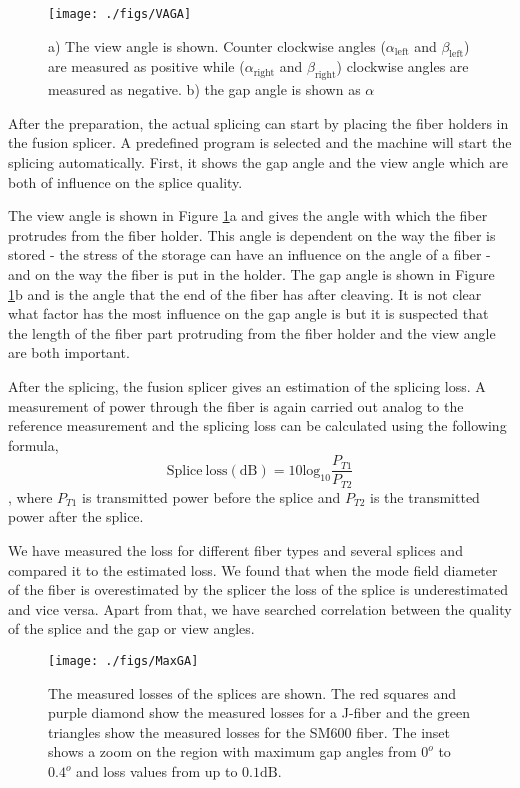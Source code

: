 \begin{figure}[h!]\centering
\texttt{[image: ./figs/VAGA]}
\caption{a) The view angle is shown. Counter clockwise angles ($\alpha_{\mathrm{left}}$ and $\beta_{\mathrm{left}}$) are measured as positive while ($\alpha_{\mathrm{right}}$ and $\beta_{\mathrm{right}}$) clockwise angles are measured as negative. b) the gap angle is shown as $\alpha$}
\label{fig:VAGA}
\end{figure}

After the preparation, the actual splicing can start by placing the fiber holders in the fusion splicer. A predefined program is selected and the machine will start the splicing automatically. First, it shows the gap angle and the view angle which are both of influence on the splice quality. 

The view angle is shown in Figure \ref{fig:VAGA}a and gives the angle with which the fiber protrudes from the fiber holder. This angle is dependent on the way the fiber is stored - the stress of the storage can have an influence on the angle of a fiber - and on the way the fiber is put in the holder. The gap angle is shown in Figure \ref{fig:VAGA}b and is the angle that the end of the fiber has after cleaving. It is not clear what factor has the most influence on the gap angle is but it is suspected that the length of the fiber part protruding from the fiber holder and the view angle are both important.

After the splicing, the fusion splicer gives an estimation of the splicing loss. A measurement of power through the fiber is again carried out analog to the reference measurement and the splicing loss can be calculated using the following formula, 
\begin{equation}
\mathrm{Splice \: loss \left(dB\right)} = 10\mathrm{ log_{10}} \frac{P_{T1}}{P_{T2}}
\end{equation}, 
where $P_{T1}$ is transmitted power before the splice and $P_{T2}$ is the transmitted power after the splice. 

We have measured the loss for different fiber types and several splices and compared it to the estimated loss. We found that when the mode field diameter of the fiber is overestimated by the splicer the loss of the splice is underestimated and vice versa. Apart from that, we have searched correlation between the quality of the splice and the gap or view angles.


\begin{figure}[h!]\centering
\texttt{[image: ./figs/MaxGA]}
\caption{The measured losses of the splices are shown. The red squares and purple diamond show the measured losses for a J-fiber and the green triangles show the measured losses for the SM600 fiber. The inset shows a zoom on the region with maximum gap angles from $0^o$ to $0.4^o$ and loss values from up to $0.1 \mathrm{dB}$.}
\label{fig:maxga}
\end{figure}
 

